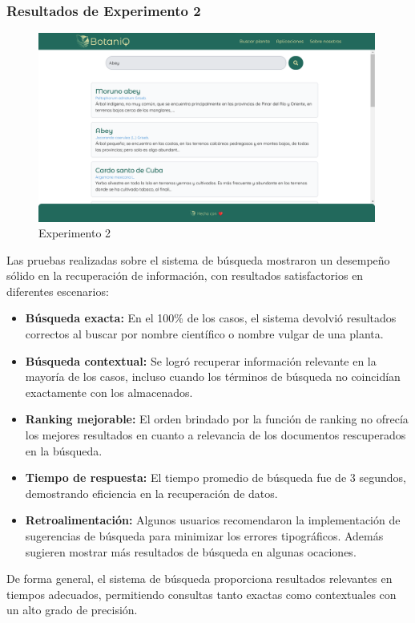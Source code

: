 \subsubsection*{Resultados de Experimento 2}
\begin{figure}[ht!]
    \centering
    \includegraphics[width=0.99\textwidth]{Images/exp2.png}
    \caption{Experimento 2}
    \label{fig:exp2}
\end{figure}
Las pruebas realizadas sobre el sistema de búsqueda mostraron un desempeño sólido en la recuperación de información, con resultados 
satisfactorios en diferentes escenarios:
\begin{itemize}
    \item \textbf{Búsqueda exacta:} En el 100\% de los casos, el sistema devolvió resultados correctos al buscar por nombre científico 
    o nombre vulgar de una planta.
    \item \textbf{Búsqueda contextual:} Se logró recuperar información relevante en la mayoría de los casos, incluso cuando los términos
    de búsqueda no coincidían exactamente con los almacenados.
    \item \textbf{Ranking mejorable:} El orden brindado por la función de ranking no ofrecía los mejores resultados en cuanto a relevancia
    de los documentos rescuperados en la búsqueda.
    \item \textbf{Tiempo de respuesta:} El tiempo promedio de búsqueda fue de 3 segundos, demostrando eficiencia en la recuperación de datos.
    \item \textbf{Retroalimentación:} Algunos usuarios recomendaron la implementación de sugerencias de búsqueda para minimizar los errores 
    tipográficos. Además sugieren mostrar más resultados de búsqueda en algunas ocaciones.
\end{itemize}
De forma general, el sistema de búsqueda proporciona resultados relevantes en tiempos adecuados, permitiendo consultas tanto exactas 
como contextuales con un alto grado de precisión.

